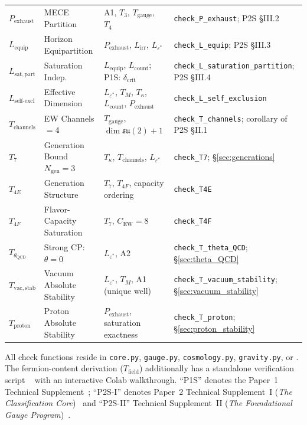 \documentclass[11pt]{article}
\begin{document}
\begin{center}
{\begin{tabular}{lp{3.2cm}p{4.5cm}l}
$P_{\mathrm{exhaust}}$ & MECE Partition & A1, $T_3$, $T_{\mathrm{gauge}}$, $T_4$ & \texttt{check\_P\_exhaust}; P2S \S III.2 \\
$L_{\mathrm{equip}}$ & Horizon Equipartition & $P_{\mathrm{exhaust}}$, $L_{\mathrm{irr}}$, $L_{\varepsilon^*}$ & \texttt{check\_L\_equip}; P2S \S III.3 \\
$L_{\mathrm{sat,part}}$ & Saturation Indep. & $L_{\mathrm{equip}}$, $L_{\mathrm{count}}$; P1S: $\delta_{\mathrm{crit}}$ & \texttt{check\_L\_saturation\_partition}; P2S \S III.4 \\
$L_{\mathrm{self\text{-}excl}}$ & Effective Dimension & $L_{\varepsilon^*}$, $T_M$, $T_\kappa$, $L_{\mathrm{count}}$, $P_{\mathrm{exhaust}}$ & \texttt{check\_L\_self\_exclusion} \\
$T_{\mathrm{channels}}$ & EW Channels $= 4$ & $T_{\mathrm{gauge}}$, $\dim\mathfrak{su}(2) + 1$ & \texttt{check\_T\_channels}; corollary of P2S \S II.1 \\
$T_7$ & Generation Bound $N_{\mathrm{gen}} = 3$ & $T_\kappa$, $T_{\mathrm{channels}}$, $L_{\varepsilon^*}$ & \texttt{check\_T7}; \S\ref{sec:generations} \\
$T_{4E}$ & Generation Structure & $T_7$, $T_{4F}$, capacity ordering & \texttt{check\_T4E} \\
$T_{4F}$ & Flavor-Capacity Saturation & $T_7$, $C_{\mathrm{EW}} = 8$ & \texttt{check\_T4F} \\
$T_{\theta_{\mathrm{QCD}}}$ & Strong CP: $\theta = 0$ & $L_{\varepsilon^*}$, A2 & \texttt{check\_T\_theta\_QCD}; \S\ref{sec:theta_QCD} \\
$T_{\mathrm{vac,stab}}$ & Vacuum Absolute Stability & $L_{\varepsilon^*}$, $T_M$, A1 (unique well) & \texttt{check\_T\_vacuum\_stability}; \S\ref{sec:vacuum_stability} \\
$T_{\mathrm{proton}}$ & Proton Absolute Stability & $P_{\mathrm{exhaust}}$, saturation exactness & \texttt{check\_T\_proton}; \S\ref{sec:proton_stability} \\
\bottomrule
\end{tabular}}
\end{center}

All check functions reside in \texttt{core.py}, \texttt{gauge.py}, \texttt{cosmology.py}, \texttt{gravity.py}, or \texttt{}.  The fermion-content derivation ($T_{\mathrm{field}}$) additionally has a standalone verification script \texttt{}~\cite{BrookeFermionScan} with an interactive Colab walkthrough.  ``P1S'' denotes the Paper~1 Technical Supplement~\cite{BrookeSupplement}; ``P2S-I'' denotes Paper~2 Technical Supplement~I (\emph{The Classification Core})~\cite{BrookeP2Supplement} and ``P2S-II'' Technical Supplement~II (\emph{The Foundational Gauge Program})~\cite{BrookeP2FoundSupplement}.
\end{document}
